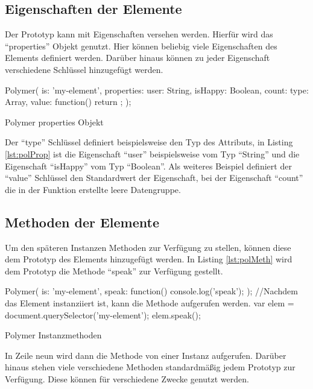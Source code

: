 \documentclass[12pt, paper=a4, bibtotoc, toc=listof, headsepline=true]{scrreprt}
\begin{document}
\subsection{Eigenschaften der Elemente}
Der Prototyp kann mit Eigenschaften versehen werden. Hierfür wird das \enquote{properties} Objekt genutzt. Hier können beliebig viele Eigenschaften des Elements definiert werden. Darüber hinaus können zu jeder Eigenschaft verschiedene Schlüssel hinzugefügt werden.
\begin{listing}
	\begin{JavaScriptcode*}{}
Polymer({
   is: 'my-element',
   properties: {
      user: String,
      isHappy: Boolean,
      count: {
         type: Array,
         value: function() { return {}; }
      }
   }
});
	\end{JavaScriptcode*}
	\caption{Polymer properties Objekt}
	\label{lst:polProp}
\end{listing}
Der \enquote{type} Schlüssel definiert beispielsweise den Typ des Attributs, in Listing \ref{lst:polProp} ist die Eigenschaft \enquote{user} beispielsweise vom Typ \enquote{String} und die Eigenschaft \enquote{isHappy} vom Typ \enquote{Boolean}. Als weiteres Beispiel definiert der \enquote{value} Schlüssel den Standardwert der Eigenschaft, bei der Eigenschaft \enquote{count} die in der Funktion erstellte leere Datengruppe.\cite{polyProp}
\subsection{Methoden der Elemente}
Um den späteren Instanzen Methoden zur Verfügung zu stellen, können diese dem Prototyp des Elements hinzugefügt werden. In Listing \ref{lst:polMeth} wird dem Prototyp die Methode \enquote{speak} zur Verfügung gestellt.
\begin{listing}
	\begin{JavaScriptcode*}{}
Polymer({
   is: 'my-element',
   speak: function(){
   console.log('speak');
   }
});
//Nachdem das Element instanziiert ist, kann die Methode aufgerufen werden.
var elem = document.querySelector('my-element');
elem.speak();
	\end{JavaScriptcode*}
	\caption{Polymer Instanzmethoden}
	\label{lst:polMeth}
\end{listing} In Zeile neun wird dann die Methode von einer Instanz aufgerufen. Darüber hinaus stehen viele verschiedene Methoden standardmäßig jedem Prototyp zur Verfügung. Diese können für verschiedene Zwecke genutzt werden.\cite{polyInstMeth}
\end{document}

